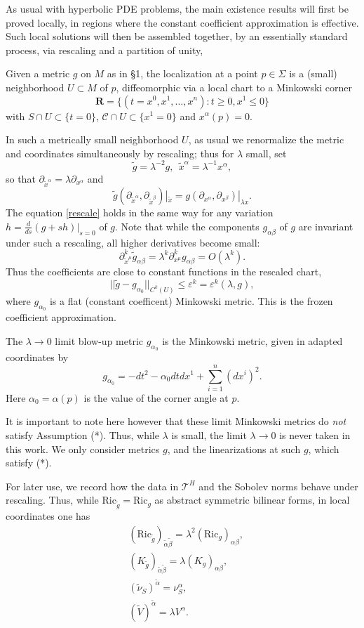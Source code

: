 \documentclass[10pt]{amsart}
\renewcommand{\a}{\alpha}
\renewcommand{\b}{\beta}
\newcommand{\e}{\varepsilon}
\newcommand{\Si}{\Sigma}
\renewcommand{\l}{\lambda}
\newcommand{\cC}{{\mathcal C}}
\newcommand{\cT}{{\mathcal T}}
\newcommand{\Ric}{\mathrm{Ric}}
\newcommand{\be}{\begin{equation}}
\newcommand{\ee}{\end{equation}}
\newcommand{\bes}{\begin{equation*}}
\newcommand{\ees}{\end{equation*}}
\newcommand{\p}{\partial}
\renewcommand{\to}{\rightarrow}
\newcommand{\<}{\langle}
\renewcommand{\>}{\rangle}
\newcommand{\w}{\widetilde}
\theoremstyle{plain}
\theoremstyle{remark}
\theoremstyle{definition}
\numberwithin{equation}{section}
\begin{document}
   As usual with hyperbolic PDE problems, the main existence results will first be proved locally, in regions where the constant coefficient 
approximation is effective. Such local solutions will then be assembled together, by an essentially standard process, via rescaling and a partition of unity, 


  Given a metric $g$ on $M$ as in \S 1, the localization at a point $p \in \Si$ is a (small) neighborhood $U \subset M$ of $p$, diffeomorphic via 
a local chart to a Minkowski corner 
$$\mathbf R=\{(t=x^0,x^1,\dots ,x^n):t\geq 0, x^1\leq 0\}$$ 
with $S\cap U \subset \{t = 0\}$, $\cC \cap U \subset \{x^1 = 0\}$ and $x^{\a}(p) = 0$. 

  In such a metrically small neighborhood $U$, as usual we renormalize the metric and coordinates simultaneously by rescaling; thus 
for $\l$ small, set 
\be \label{renor}
\w g = \l^{-2}g, \ \ \w x^\a=\l^{-1}x^\a,
\ee
so that $\p_{\w x^{\a}} = \l \p_{x^{\a}}$ and  
\be\label{rescale}
\w g(\p_{\w x^\a},\p_{\w x^\b})|_{\w x} = g(\p_{ x^\a},\p_{ x^\b})|_{\l x}. 
\ee
The equation \eqref{rescale} holds in the same way for any variation $h = \frac{d}{ds}(g + sh)|_{s=0}$ of $g$. Note that while the components 
$g_{\a\b}$ of $g$ are invariant under such a rescaling, all higher derivatives become small: 
\be \label{lambda}
\p_{\w x^{\mu}}^k \w g_{\a\b} = \l^k \p_{x^{\mu}}^k g_{\a\b} = O(\l^k).
\ee
Thus the coefficients are close to constant functions in the rescaled chart, 
\be \label{eps}
||\w g - g_{\a_0}||_{C^{k}(U)} \leq \e^k = \e^k(\l, g),
\ee
where $g_{\a_0}$ is a flat (constant coefficent) Minkowski metric. This is the frozen coefficient approximation. 

  The $\l \to 0$ limit blow-up metric $g_{\a_0}$ is the Minkowski metric, given in adapted coordinates by 
  \bes
g_{\a_0} =-dt^2-\a_0 dtdx^1+\sum_{i=1}^n(dx^i)^2.
\ees
Here $\a_0 = \a(p)$ is the value of the corner angle at $p$. 

  It is important to note here however that these limit Minkowski metrics do {\it not} satisfy Assumption (*). Thus, while $\l$ is small, the 
limit $\l \to 0$ is never taken in this work. We only consider metrics $g$, and the linearizations at such $g$, which satisfy (*). 

  For later use, we record how the data in $\cT^H$ and the Sobolev norms behave under rescaling. Thus, while $\Ric_{\w g} = \Ric_g$ as abstract 
symmetric bilinear forms, in local coordinates one has 
\bes
\begin{split}
&(\Ric_{\w g})_{\w \a \w \b} = \l^2 (\Ric_g)_{\a\b}, \\
&(K_{\w g})_{\w \a \w \b} = \l (K_g)_{\a\b}, \\
&(\w \nu_S)^{\w \a} = \nu_S^{\a}, \\
&(\w V)^{\w \a} = \l V^{\a}. \\
\end{split}
\ees
\end{document}
